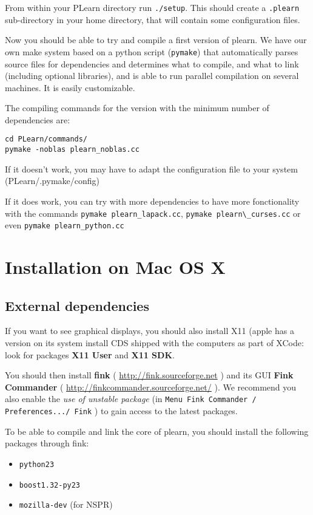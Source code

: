 \documentclass[11pt]{book}
\begin{document}
From within your PLearn directory run {\tt ./setup}. This should create a
{\tt .plearn} sub-directory in your home directory, that will contain some
configuration files.

Now you should be able to try and compile a first version of plearn.
We have our own make system based on a python script ({\tt pymake}) that
automatically parses source files for dependencies and determines what to
compile, and what to link (including optional libraries), and is able to
run parallel compilation on several machines.  It is easily
customizable.

The compiling commands for the version with the minimum number of dependencies are:
\begin{verbatim}
cd PLearn/commands/
pymake -noblas plearn_noblas.cc
\end{verbatim}

If it doesn't work, you may have to adapt the configuration file to your system
(PLearn/.pymake/config)

If it does work, you can try with more dependencies to have more fonctionality with the commands \verb!pymake plearn_lapack.cc!, \verb!pymake plearn\_curses.cc! or even \verb!pymake plearn_python.cc!

\section{Installation on Mac OS X}

\subsection{External dependencies}
If you want to see graphical displays, you should also install X11 (apple
has a version on its system install CDS shipped with the computers as part
of XCode: look for packages {\bf X11 User} and {\bf X11 SDK}.

You should then install {\bf fink} ( \url{http://fink.sourceforge.net} )
and its GUI {\bf Fink Commander} ( \url{http://finkcommander.sourceforge.net/} ).
We recommend you also enable the {\em use of unstable package} (in {\tt Menu Fink
Commander / Preferences.../ Fink} ) to gain access to the latest packages.

To be able to compile and link the core of plearn, you should install the
following packages through fink:
\begin{itemize}
\item {\tt python23}
\item {\tt boost1.32-py23}
\item {\tt mozilla-dev} (for NSPR)
\end{itemize}
\end{document}
